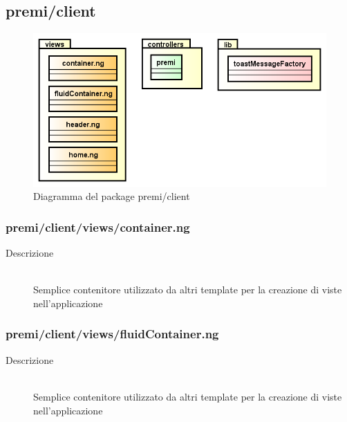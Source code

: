\clearpage
\subsection{premi/client}
\begin{figure}[h]
\begin{center}
\includegraphics[scale=0.50]{img/diapkg/client.png}
\caption{Diagramma del package premi/client}
\end{center}
\end{figure}



\subsubsection{premi/client/views/container.ng}

\begin{description}
\item[Descrizione] \hfill \\
	Semplice contenitore utilizzato da altri template per la creazione di viste nell'applicazione
\end{description}



\subsubsection{premi/client/views/fluidContainer.ng}

\begin{description}
\item[Descrizione] \hfill \\
	Semplice contenitore utilizzato da altri template per la creazione di viste nell'applicazione
\end{description}



